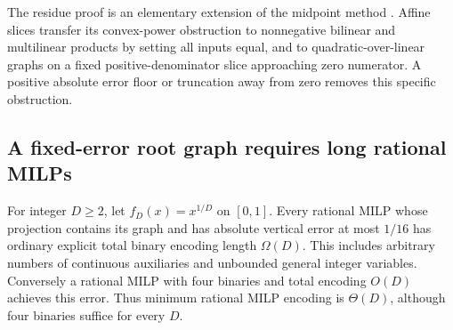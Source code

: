 The residue proof is an elementary extension of the midpoint method
\citep{lubin2022}. Affine slices transfer its convex-power obstruction
to nonnegative bilinear and multilinear products by setting all inputs
equal, and to quadratic-over-linear graphs on a fixed positive-denominator
slice approaching zero numerator. A positive absolute error floor or
truncation away from zero removes this specific obstruction.

\subsection{A fixed-error root graph requires long rational MILPs}

\begin{theorem}\label{thm:root-encoding}
For integer $D\ge2$, let $f_D(x)=x^{1/D}$ on $[0,1]$.
Every rational MILP whose projection contains its graph and has
absolute vertical error at most $1/16$ has ordinary explicit total
binary encoding length $\Omega(D)$. This includes arbitrary numbers
of continuous auxiliaries and unbounded general integer variables.
Conversely a rational MILP with four binaries and total encoding
$O(D)$ achieves this error. Thus minimum rational MILP encoding is
$\Theta(D)$, although four binaries suffice for every $D$.
\end{theorem}
